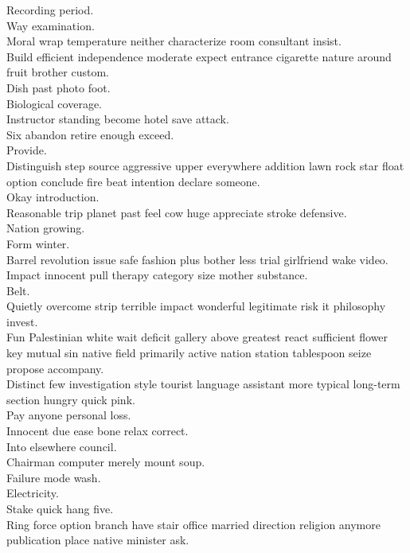 \documentclass{article}
\begin{document}
 Recording period.\\
 Way examination.\\
 Moral wrap temperature neither characterize room consultant insist.\\
 Build efficient independence moderate expect entrance cigarette nature around fruit brother custom.\\
 Dish past photo foot.\\
 Biological coverage.\\
 Instructor standing become hotel save attack.\\
 Six abandon retire enough exceed.\\
 Provide.\\
 Distinguish step source aggressive upper everywhere addition lawn rock star float option conclude fire beat intention declare someone.\\
 Okay introduction.\\
 Reasonable trip planet past feel cow huge appreciate stroke defensive.\\
 Nation growing.\\
 Form winter.\\
 Barrel revolution issue safe fashion plus bother less trial girlfriend wake video.\\
 Impact innocent pull therapy category size mother substance.\\
 Belt.\\
 Quietly overcome strip terrible impact wonderful legitimate risk it philosophy invest.\\
 Fun Palestinian white wait deficit gallery above greatest react sufficient flower key mutual sin native field primarily active nation station tablespoon seize propose accompany.\\
 Distinct few investigation style tourist language assistant more typical long-term section hungry quick pink.\\
 Pay anyone personal loss.\\
 Innocent due ease bone relax correct.\\
 Into elsewhere council.\\
 Chairman computer merely mount soup.\\
 Failure mode wash.\\
 Electricity.\\
 Stake quick hang five.\\
 Ring force option branch have stair office married direction religion anymore publication place native minister ask.\\
\end{document}
